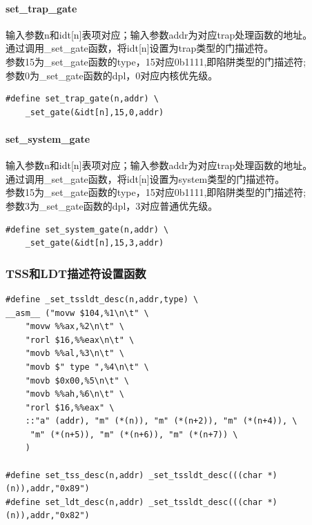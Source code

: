 \documentclass[12pt]{article}
\begin{document}
\paragraph{set\_trap\_gate}	
输入参数n和idt[n]表项对应；输入参数addr为对应trap处理函数的地址。\\
通过调用\_set\_gate函数，将idt[n]设置为trap类型的门描述符。\\
参数15为\_set\_gate函数的type，15对应0b1111,即陷阱类型的门描述符;\\
参数0为\_set\_gate函数的dpl，0对应内核优先级。
\begin{lstlisting}[breaklines]
#define set_trap_gate(n,addr) \
	_set_gate(&idt[n],15,0,addr)
\end{lstlisting}
\paragraph{set\_system\_gate}	
输入参数n和idt[n]表项对应；输入参数addr为对应trap处理函数的地址。\\
通过调用\_set\_gate函数，将idt[n]设置为system类型的门描述符。\\
参数15为\_set\_gate函数的type，15对应0b1111,即陷阱类型的门描述符;\\
参数3为\_set\_gate函数的dpl，3对应普通优先级。
\begin{lstlisting}[breaklines]
#define set_system_gate(n,addr) \
	_set_gate(&idt[n],15,3,addr)
\end{lstlisting}
\subsubsection{TSS和LDT描述符设置函数}	
\begin{lstlisting}[breaklines]
#define _set_tssldt_desc(n,addr,type) \
__asm__ ("movw $104,%1\n\t" \
	"movw %%ax,%2\n\t" \
	"rorl $16,%%eax\n\t" \
	"movb %%al,%3\n\t" \
	"movb $" type ",%4\n\t" \
	"movb $0x00,%5\n\t" \
	"movb %%ah,%6\n\t" \
	"rorl $16,%%eax" \
	::"a" (addr), "m" (*(n)), "m" (*(n+2)), "m" (*(n+4)), \
	 "m" (*(n+5)), "m" (*(n+6)), "m" (*(n+7)) \
	)

#define set_tss_desc(n,addr) _set_tssldt_desc(((char *) (n)),addr,"0x89")
#define set_ldt_desc(n,addr) _set_tssldt_desc(((char *) (n)),addr,"0x82")
\end{lstlisting}
\end{document}
